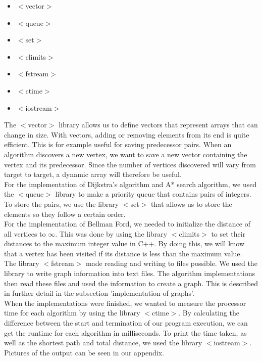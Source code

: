 \documentclass[11pt]{article}
\begin{document}
\begin{itemize}
\item $<$vector$>$
\item $<$queue$>$
\item $<$set$>$
\item$<$climits$>$
\item $<$fstream$>$
\item$<$ctime$>$
\item $<$iostream$>$
\end{itemize}

\noindent The $<$vector$>$ library allows us to define vectors that represent arrays that can change in size. With vectors, adding or removing elements from its end is quite efficient. This is for example useful for saving predecessor pairs. When an algorithm discovers a new vertex, we want to save a new vector containing the vertex and its predecessor. Since the number of vertices discovered will vary from target to target, a dynamic array will therefore be useful.\\

\noindent For the implementation of Dijkstra's algorithm and A* search algorithm, we used the $<$queue$>$ library to make a priority queue that contains pairs of integers. To store the pairs, we use the library $<$set$>$ that allows us to store the elements so they follow a certain order.\\

\noindent For the implementation of Bellman Ford, we needed to initialize the distance of all vertices to $\infty$. This was done by using the library $<$climits$>$ to set their distances to the maximum integer value in C++. By doing this, we will know that a vertex has been visited if its distance is less than the maximum value.\\

\noindent The library $<$fstream$>$ made reading and writing to files possible. We used the library to write graph information into text files. The algorithm implementations then read these files and used the information to create a graph. This is described in further detail in the subsection 'implementation of graphs'.\\

\noindent When the implementations were finished, we wanted to measure the processor time for each algorithm by using the library $<$ctime$>$. By calculating the difference between the start and termination of our program execution, we can get the runtime for each algorithm in milliseconds. To print the time taken, as well as the shortest path and total distance, we used the library $<$iostream$>$. Pictures of the output can be seen in our appendix.\\
\end{document}

